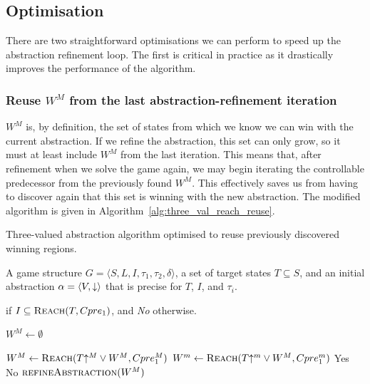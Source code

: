 \subsection{Optimisation}

There are two straightforward optimisations we can perform to speed up the abstraction refinement loop. The first is critical in practice as it drastically improves the performance of the algorithm.

\subsubsection{Reuse $W^M$ from the last abstraction-refinement iteration}

$W^M$ is, by definition, the set of states from which we know we can win with the current abstraction. If we refine the abstraction, this set can only grow, so it must at least include $W^M$ from the last iteration. This means that, after refinement when we solve the game again, we may begin iterating the controllable predecessor from the previously found $W^M$. This effectively saves us from having to discover again that this set is winning with the new abstraction. The modified algorithm is given in Algorithm~\ref{alg:three_val_reach_reuse}.

\begin{algorithm}
\caption{Three-valued abstraction algorithm optimised to reuse previously discovered winning regions.}
\label{alg:three_val_reach_reuse}

\begin{algorithmic}[1]

\Require A game structure $G = \langle S, L, I, \tau_1, \tau_2, \delta \rangle$, a set 
of target states $T\subseteq S$, and an initial abstraction $\alpha=\langle V, \mathord{\downarrow} \rangle$
that is precise for $T$, $I$, and $\tau_i$.

 if $I \subseteq \textsc{Reach}(T, Cpre_1)$, and {\it No} otherwise.


    \State $W^M \gets \emptyset$

    \Loop
        \State $W^M \gets \textsc{Reach}(T\mathord{\uparrow^M} \vee W^M, Cpre_1^M)$
        \State $W^m \gets \textsc{Reach}(T\mathord{\uparrow^m} \vee W^M, Cpre_1^m)$
            \State\Return Yes
            \State\Return No
        \Else       
            \State$\Call{refineAbstraction}{W^M}$
        \EndIf
    \EndLoop
\EndFunction

\end{algorithmic}
\end{algorithm}

